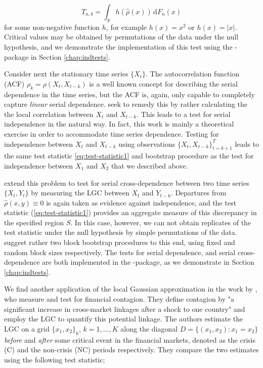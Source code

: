 \begin{equation}
T_{n,b} = \int_S h\left(\widehat \rho(x) \right) \,\textrm{d}F_n(x)
\label{eq:test-statistic1}
\end{equation}
for some non-negative function $h$, for example $h(x) = x^2$ or $h(x) = |x|$. Critical values may be obtained by permutations of the data under the null hypothesis, and we demonstrate the implementation of this test using the -package in Section \ref{chap:indtests}.

Consider next the stationary time series $\{X_t\}$. The autocorrelation function (ACF) $\rho_k = \rho(X_t, X_{t-k})$ is a well known concept for describing the serial dependence in the time series, but the ACF is, again, only capable to completely capture \emph{linear} serial dependence. \citet{laca:tjos:2017} seek to remedy this by rather calculating the the local correlation between $X_t$ and $X_{t-k}$. This leads to a test for serial independence in the natural way. In fact, this work is mainly a theoretical exercise in order to accommodate time series dependence. Testing for independence between $X_t$ and $X_{t-k}$ using observations $\{X_t, X_{t-k}\}_{t = k+1}^T$ leads to the same test statistic \eqref{eq:test-statistic1} and bootstrap procedure as the test for independence between $X_1$ and $X_2$ that we described above. 

\citet{laca:tjos:2018} extend this problem to test for serial cross-dependence between two time series $\{X_t, Y_t\}$ by measuring the LGC between $X_t$ and $Y_{t-k}$. Departures from $\widehat\rho(x,y) \equiv 0$ is again taken as evidence against independence, and the test statistic (\ref{eq:test-statistic1}) provides an aggregate measure of this discrepancy in the specified region $S$. In this case, however, we can not obtain replicates of the test statistic under the null hypothesis by simple permutations of the data. \citet{laca:tjos:2018} suggest rather two block bootstrap procedures to this end, using fixed and random block sizes respectively. The tests for serial dependence, and serial cross-dependence are both implemented in the -package, as we demonstrate in Section \ref{chap:indtests}.

We find another application of the local Gaussian approximation in the work by \citet{stov:tjos:huft:2014}, who measure and test for financial contagion. They define contagion by "a significant increase in cross-market linkages after a shock to one country" \citep[p. 2223]{forb:rigo:2002} and employ the LGC to quantify this potential linkage. The authors estimate the LGC on a grid $\{x_1, x_2\}_k$, $k=1,\ldots,K$ along the diagonal $D=\{(x_1,x_2): x_1 = x_2\}$ \emph{before} and \emph{after} some critical event in the financial markets, denoted as the crisis (C) and the non-crisis (NC) periods respectively. They compare the two estimates using the following test statistic; 

